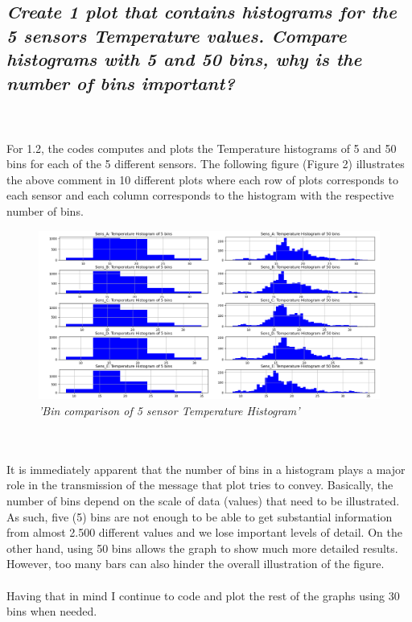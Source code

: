 \documentclass[a4paper,12pt]{article} %
\begin{document}
\subsection{\it Create 1 plot that contains histograms for the 5 sensors Temperature values. Compare histograms with 5 and 50 bins, why is the number of bins important?}
\\\\
For 1.2, the codes computes and plots the Temperature
histograms of 5 and 50 bins for each of the 5 different sensors. 
The following figure (Figure 2) illustrates the above comment in 10 different 
plots where each row of plots corresponds to each sensor and each column 
corresponds to the histogram with the respective number of bins.
\\
\begin{figure}[H]
\centering
\includegraphics[width=\textwidth]{Graphs/Bin_comparison_of_5_sensor_Temperature_Histogram.png}
\caption{\it'Bin comparison of 5 sensor Temperature Histogram'}
\end{figure}
\\\\
It is immediately apparent that the number of bins in a histogram plays a 
major role in the transmission of the message that plot tries to convey. 
Basically, the number of bins depend on the scale of data (values) 
that need to be illustrated. As such, five (5) bins are not enough 
to be able to get substantial information from almost 2.500 different 
values and we lose important levels of detail. On the other hand, using 
50 bins allows the graph to show much more detailed results. However, too 
many bars can also hinder the overall illustration of the figure.
\\\\
Having that in mind I continue to code and plot the rest of the graphs using 30 bins when needed.  
\\\\
\end{document}
